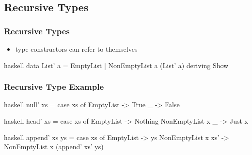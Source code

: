 \documentclass[dvipsnames]{beamer}
\theoremstyle{plain}
\begin{document}
\subsection{Recursive Types}

\begin{frame}[fragile]
  \frametitle{Recursive Types}

  \begin{itemize}
    \item type constructors can refer to themselves
  \end{itemize}

  \pause
  \begin{example}[Haskell]
    \begin{pygments}{haskell}
data List' a = EmptyList | NonEmptyList a (List' a)
               deriving Show
    \end{pygments}
  \end{example}
\end{frame}

\begin{frame}[fragile]
  \frametitle{Recursive Type Example}

  \begin{example}[Haskell]
    \begin{pygments}{haskell}
null' xs =
    case xs of
      EmptyList -> True
      _ -> False
    \end{pygments}

    \pause
    \smallskip
    \begin{pygments}{haskell}
head' xs =
    case xs of
      EmptyList -> Nothing
      NonEmptyList x _ -> Just x
    \end{pygments}

    \pause
    \smallskip
    \begin{pygments}{haskell}
append' xs ys =
    case xs of
      EmptyList -> ys
      NonEmptyList x xs' -> NonEmptyList x (append' xs' ys)
    \end{pygments}
  \end{example}
\end{frame}
\end{document}
